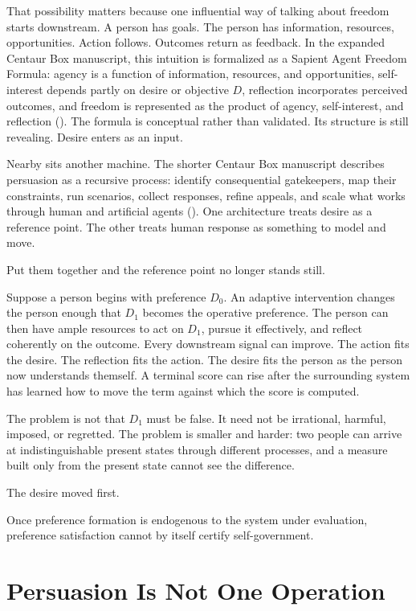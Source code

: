 \documentclass[
  10.5pt,
  letterpaper,
]{article}
\begin{document}
That possibility matters because one influential way of talking about
freedom starts downstream. A person has goals. The person has
information, resources, opportunities. Action follows. Outcomes return
as feedback. In the expanded Centaur Box manuscript, this intuition is
formalized as a Sapient Agent Freedom Formula: agency is a function of
information, resources, and opportunities, self-interest depends partly
on desire or objective \(D\), reflection incorporates perceived
outcomes, and freedom is represented as the product of agency,
self-interest, and reflection
(). The formula
is conceptual rather than validated. Its structure is still revealing.
Desire enters as an input.

Nearby sits another machine. The shorter Centaur Box manuscript
describes persuasion as a recursive process: identify consequential
gatekeepers, map their constraints, run scenarios, collect responses,
refine appeals, and scale what works through human and artificial agents
(). One
architecture treats desire as a reference point. The other treats human
response as something to model and move.

Put them together and the reference point no longer stands still.

Suppose a person begins with preference \(D_0\). An adaptive
intervention changes the person enough that \(D_1\) becomes the
operative preference. The person can then have ample resources to act on
\(D_1\), pursue it effectively, and reflect coherently on the outcome.
Every downstream signal can improve. The action fits the desire. The
reflection fits the action. The desire fits the person as the person now
understands themself. A terminal score can rise after the surrounding
system has learned how to move the term against which the score is
computed.

The problem is not that \(D_1\) must be false. It need not be
irrational, harmful, imposed, or regretted. The problem is smaller and
harder: two people can arrive at indistinguishable present states
through different processes, and a measure built only from the present
state cannot see the difference.

The desire moved first.

Once preference formation is endogenous to the system under evaluation,
preference satisfaction cannot by itself certify self-government.

\section{Persuasion Is Not One
Operation}\label{persuasion-is-not-one-operation}
\end{document}
